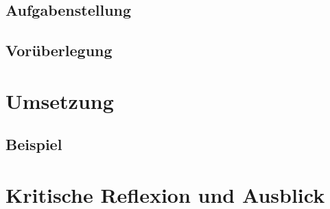 \documentclass[12pt]{report}
\begin{document}
\newpage
\section{Aufgabenstellung}



\newpage
\section{Vorüberlegung}



\newpage
\chapter{Umsetzung}



\newpage
\section{Beispiel}


\newpage
\chapter{Kritische Reflexion und Ausblick}



\newpage
{}


\setcounter{page}{7}
\renewcommand{\refname}{Literaturverzeichnis}


\end{document}
